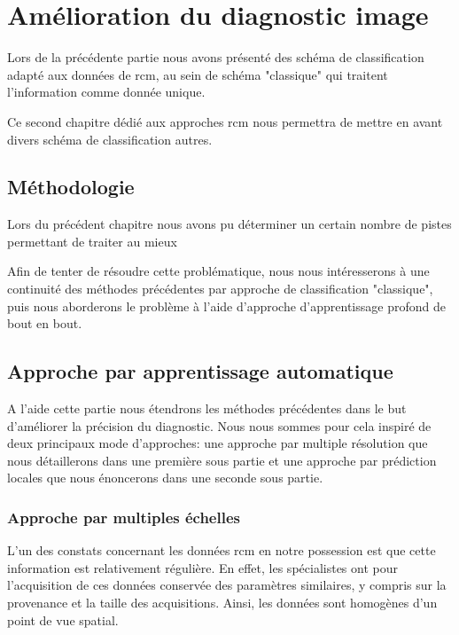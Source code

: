 \chapter{Amélioration du diagnostic image}
\label{chap:chapter_5}
\chapterintro
Lors de la précédente partie nous avons présenté des schéma de classification adapté aux données de \gls{rcm}, au sein de schéma "classique" qui traitent l'information comme donnée unique.\par

Ce second chapitre dédié aux approches \gls{rcm} nous permettra de mettre en avant divers schéma de classification autres.\par

\newpage

\section{Méthodologie}
Lors du précédent chapitre nous avons pu déterminer un certain nombre de pistes permettant de traiter au mieux\par

Afin de tenter de résoudre cette problématique, nous nous intéresserons à une continuité des méthodes précédentes par approche de classification "classique", puis nous aborderons le problème à l'aide d'approche d'apprentissage profond de bout en bout.\par

\section{Approche par apprentissage automatique}
A l'aide cette partie nous étendrons les méthodes précédentes dans le but d'améliorer la précision du diagnostic. Nous nous sommes pour cela inspiré de deux principaux mode d'approches: une approche par multiple résolution que nous détaillerons dans une première sous partie et une approche par prédiction locales que nous énoncerons dans une seconde sous partie.\par

\subsection{Approche par multiples échelles}
L'un des constats concernant les données \gls{rcm} en notre possession est que cette information est relativement régulière. En effet, les spécialistes ont pour l'acquisition de ces données conservée des paramètres similaires, y compris sur la provenance et la taille des acquisitions. Ainsi, les données sont homogènes d'un point de vue spatial.\par

